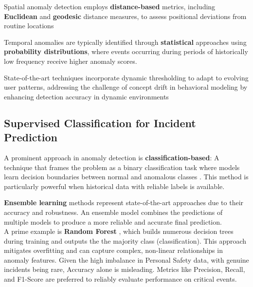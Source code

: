 \documentclass[12pt,a4paper,oneside,english]{book}
\begin{document}
Spatial anomaly detection employs \textbf{distance-based} metrics, including \textbf{Euclidean} and \textbf{geodesic} distance measures, to assess positional deviations from routine locations %

Temporal anomalies are typically identified through \textbf{statistical} approaches using \textbf{probability distributions}, where events occurring during periods of historically low frequency receive higher anomaly scores.

State-of-the-art techniques incorporate dynamic thresholding to adapt to evolving user patterns, addressing the challenge of concept drift in behavioral modeling  by enhancing detection accuracy in dynamic environments%

\subsection{Supervised Classification for Incident Prediction}
\label{sec:supervised_classification}

A prominent approach in anomaly detection is \textbf{classification-based}: A technique that frames the problem as a binary classification task where models learn decision boundaries between normal and anomalous classes \cite{chandola2009anomaly}. This method is particularly powerful when historical data with reliable labels is available.

\textbf{Ensemble learning} methods represent state-of-the-art approaches due to their accuracy and robustness. An ensemble model combines the predictions of multiple models to produce a more reliable and accurate final prediction.
\\A prime example is \textbf{Random Forest} \cite{Breiman2001RF}, which builds numerous decision trees during training and outputs the the majority class (classification). This approach mitigates overfitting and can capture complex, non-linear relationships in anomaly features.
Given the high imbalance in Personal Safety data, with genuine incidents being rare, Accuracy alone is misleading. Metrics like Precision, Recall, and F1-Score are preferred to reliably evaluate performance on critical events.

\end{document}
